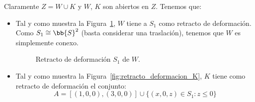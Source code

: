 \documentclass[12pt]{article}
\begin{document}
\begin{ejercicio}
\begin{itemize}
            Claramente $Z = W\cup K$ y $W$, $K$ son abiertos en $Z$. Tenemos que:
            \begin{itemize}
                \item Tal y como muestra la Figura~\ref{fig:retracto_deformacion_W}, $W$ tiene a $S_1$ como retracto de deformación. Como $S_1\cong \bb{S}^2$ (basta considerar una traslación), tenemos que $W$ es simplemente conexo.
                \begin{figure}[ht]
                    \centering
                    \caption{Retracto de deformación $S_1$ de $W$.}
                    \label{fig:retracto_deformacion_W}
                \end{figure}

                \item Tal y como muestra la Figura~\ref{fig:retracto_deformacion_K}, $K$ tiene como retracto de deformación el conjunto:
                \begin{equation*}
                    A = [(1,0,0),(3,0,0)] \cup \{(x,0,z)\in S_1 : z\leq 0\}
                \end{equation*}
                \begin{figure}[ht]
                    \centering
\end{figure}
\end{itemize}
\end{itemize}
\end{ejercicio}
\end{document}
